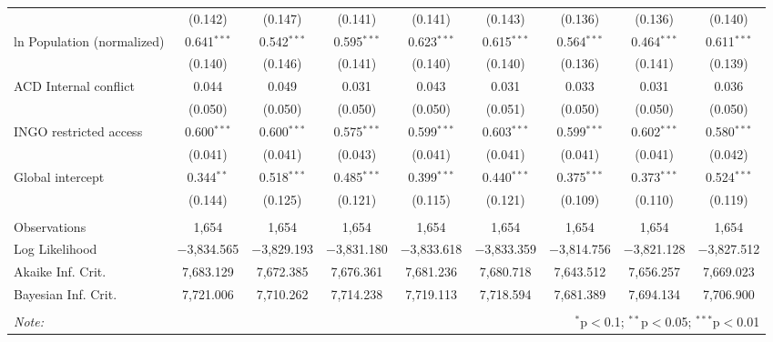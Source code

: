 \begin{sidewaystable}[!htbp]
\begin{tabular}{@{\extracolsep{5pt}}lcccccccc}
  & (0.142) & (0.147) & (0.141) & (0.141) & (0.143) & (0.136) & (0.136) & (0.140) \\ 
  ln Population (normalized) & 0.641$^{***}$ & 0.542$^{***}$ & 0.595$^{***}$ & 0.623$^{***}$ & 0.615$^{***}$ & 0.564$^{***}$ & 0.464$^{***}$ & 0.611$^{***}$ \\ 
  & (0.140) & (0.146) & (0.141) & (0.140) & (0.140) & (0.136) & (0.141) & (0.139) \\ 
  ACD Internal conflict & 0.044 & 0.049 & 0.031 & 0.043 & 0.031 & 0.033 & 0.031 & 0.036 \\ 
  & (0.050) & (0.050) & (0.050) & (0.050) & (0.051) & (0.050) & (0.050) & (0.050) \\ 
  INGO restricted access & 0.600$^{***}$ & 0.600$^{***}$ & 0.575$^{***}$ & 0.599$^{***}$ & 0.603$^{***}$ & 0.599$^{***}$ & 0.602$^{***}$ & 0.580$^{***}$ \\ 
  & (0.041) & (0.041) & (0.043) & (0.041) & (0.041) & (0.041) & (0.041) & (0.042) \\ 
  Global intercept & 0.344$^{**}$ & 0.518$^{***}$ & 0.485$^{***}$ & 0.399$^{***}$ & 0.440$^{***}$ & 0.375$^{***}$ & 0.373$^{***}$ & 0.524$^{***}$ \\ 
  & (0.144) & (0.125) & (0.121) & (0.115) & (0.121) & (0.109) & (0.110) & (0.119) \\ 
 \hline \\[-1.8ex] 
Observations & 1,654 & 1,654 & 1,654 & 1,654 & 1,654 & 1,654 & 1,654 & 1,654 \\ 
Log Likelihood & $-$3,834.565 & $-$3,829.193 & $-$3,831.180 & $-$3,833.618 & $-$3,833.359 & $-$3,814.756 & $-$3,821.128 & $-$3,827.512 \\ 
Akaike Inf. Crit. & 7,683.129 & 7,672.385 & 7,676.361 & 7,681.236 & 7,680.718 & 7,643.512 & 7,656.257 & 7,669.023 \\ 
Bayesian Inf. Crit. & 7,721.006 & 7,710.262 & 7,714.238 & 7,719.113 & 7,718.594 & 7,681.389 & 7,694.134 & 7,706.900 \\ 
\hline 
\hline \\[-1.8ex] 
\textit{Note:}  & \multicolumn{8}{r}{$^{*}$p$<$0.1; $^{**}$p$<$0.05; $^{***}$p$<$0.01} \\ 
\end{tabular} 
\end{sidewaystable} 
